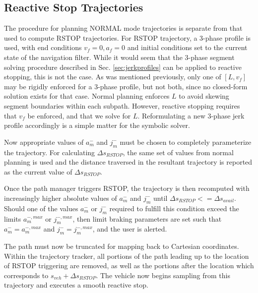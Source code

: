 \documentclass[letterpaper, 10 pt, conference]{ieeeconf}  %
\begin{document}

\subsection{Reactive Stop Trajectories} \label{sec:reactivestoptrajectory}

The procedure for planning NORMAL mode trajectories is separate from that used to compute RSTOP trajectories.
For RSTOP trajectory, a 3-phase profile is used, with end conditions $v_f=0, a_f=0$ and initial conditions set to the current state of the navigation filter.
While it would seem that the 3-phase segment solving procedure described in Sec. 
\ref{sec:jerkprofiles} can be applied to reactive stopping, this is not the case.
As was mentioned previously, only one of $[L, v_f]$ may be rigidly enforced for a 3-phase profile, but not both, since no closed-form solution exists for that case.
Normal planning enforces $L$ to avoid skewing segment boundaries within each subpath.
However, reactive stopping requires that $v_f$ be enforced, and that we solve for $L$.
Reformulating a new 3-phase jerk profile accordingly is a simple matter for the symbolic solver.

Now appropriate values of $a_m^-$ and $j_m^-$ must be chosen to completely parameterize the trajectory.
For calculating $\Delta s_{RSTOP}$, the same set of values from normal planning is used and the distance traversed in the resultant trajectory is reported as the current value of $\Delta s_{RSTOP}$.

Once the path manager triggers RSTOP, the trajectory is then recomputed with increasingly higher absolute values of $a_m^-$ and $j_m^-$ until $\Delta s_{RSTOP} <= \Delta s_{avail}$.
Should one of the values $a_m^-$ or $j_m^-$ required to fulfill this condition exceed the limits $a_m^{-,max}$ or $j_m^{-,max}$, then limit braking parameters are set such that $a_m^-=a_m^{-,max}$ and $j_m^-=j_m^{-,max}$, and the user is alerted.

The path must now be truncated for mapping back to Cartesian coordinates.
Within the trajectory tracker, all portions of the path leading up to the location of RSTOP triggering are removed, as well as the portions after the location which corresponds to $s_{veh} + \Delta s_{RSTOP}$.
The vehicle now begins sampling from this trajectory and executes a smooth reactive stop.
\end{document}
